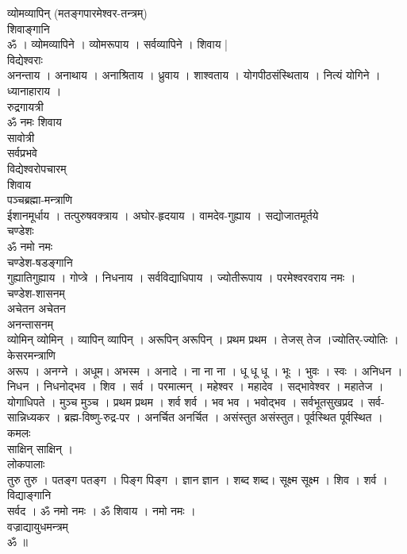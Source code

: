 \documentclass[12pt]{article}
\begin{document}
{\large{\sktr
{\color{Brown} व्योमव्यापिन् (मतङ्गपारमेश्वर-तन्त्रम्)}\\[5pt]
{\color{CadetBlue} शिवाङ्गानि}\\[5pt]
{\color{NavyBlue}ॐ । व्योमव्यापिने । व्योमरूपाय । सर्वव्यापिने । शिवाय |}\\[5pt]
{\color{CadetBlue} विद्येश्वराः}\\[5pt]
{\color{NavyBlue}अनन्ताय । अनाथाय । अनाश्रिताय । ध्रुवाय । शाश्वताय । योगपीठसंस्थिताय । नित्यं योगिने । ध्यानाहाराय ।}\\[5pt]
{\color{CadetBlue} रुद्रगायत्री}\\[5pt]
{\color{NavyBlue} ॐ नमः शिवाय }\\[5pt]
{\color{CadetBlue} सावोत्री}\\[5pt]
{\color{NavyBlue}  सर्वप्रभवे }\\[5pt]
{\color{CadetBlue} विद्येश्वरोपचारम् } \\[5pt]
{\color{NavyBlue}  शिवाय}\\[5pt]
{\color{CadetBlue} पञ्चब्रह्मा-मन्त्राणि } \\[5pt]
{\color{NavyBlue} ईशानमूर्धाय । तत्पुरुषवक्त्राय । अघोर-हृदयाय ।  वामदेव-गुह्याय  । सद्योजातमूर्तये }\\[5pt]
{\color{CadetBlue} चण्डेशः } \\[5pt]	
{\color{NavyBlue} ॐ नमो नमः }\\[5pt]
{\color{CadetBlue} चण्डेश-षडङ्गानि } \\[5pt]
{\color{NavyBlue}  गुह्यातिगुह्याय ।  गोप्त्रे  ।  निधनाय । सर्वविद्याधिपाय  ।  ज्योतीरूपाय  । परमेश्वरवराय नमः । }\\[5pt]	
{\color{CadetBlue} चण्डेश-शासनम् } \\[5pt]
{\color{NavyBlue} अचेतन अचेतन}\\[5pt]
{\color{CadetBlue} अनन्तासनम् } \\[5pt]
{\color{NavyBlue}  व्योमिन् व्योमिन् ।  व्यापिन् व्यापिन् । अरूपिन् अरूपिन् । प्रथम प्रथम ।  तेजस् तेज ।ज्योतिर्-ज्योतिः । \\[5pt] }
{\color{CadetBlue} केसरमन्त्राणि } \\[5pt]
{\color{NavyBlue}  अरूप । अनग्ने । अधूम। अभस्म । अनादे । ना ना ना ।  धू धू धू ।  भूः । भुवः । स्वः । अनिधन । निधन । निधनोद्भव । शिव ।  सर्व । परमात्मन् । महेश्वर । महादेव । सद्भावेश्वर । महातेज । योगाधिपते ।  मुञ्च मुञ्च । प्रथम प्रथम । शर्व शर्व । भव भव । भवोद्भव । सर्वभूतसुखप्रद ।  सर्व-सान्निध्यकर । ब्रह्म-विष्णु-रुद्र-पर । अनर्चित अनर्चित । असंस्तुत असंस्तुत। पूर्वस्थित पूर्वस्थित । }\\[5pt]
{\color{CadetBlue} कमलः } \\[5pt]	
{\color{NavyBlue} साक्षिन् साक्षिन् ।}\\[5pt]	
{\color{CadetBlue} लोकपालाः } \\[5pt]	
{\color{NavyBlue} तुरु तुरु । पतङ्ग पतङ्ग । पिङ्ग पिङ्ग । ज्ञान ज्ञान । शब्द शब्द। सूक्ष्म सूक्ष्म । शिव । शर्व ।  }\\[5pt]
{\color{CadetBlue} विद्याङ्गानि } \\[5pt]	
{\color{NavyBlue} सर्वद । ॐ नमो नमः । ॐ शिवाय । नमो नमः । }\\[5pt]
{\color{CadetBlue} वज्राद्यायुधमन्त्रम्} \\[5pt]	
{\color{NavyBlue} ॐ ॥}
}}
\end{document}
